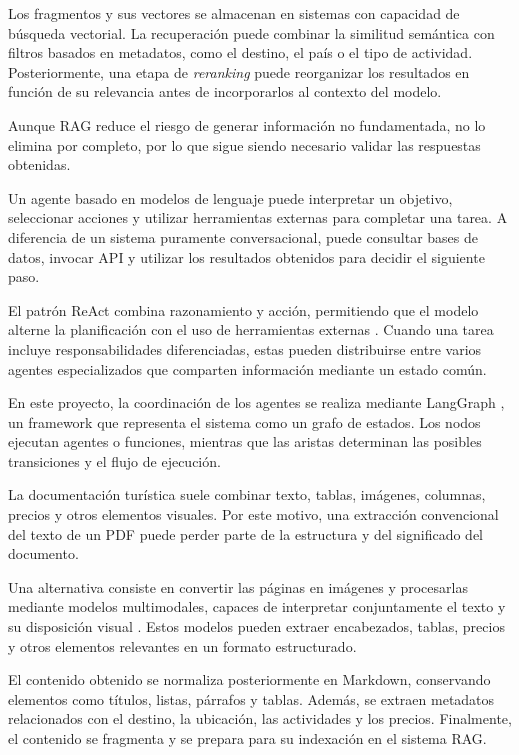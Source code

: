 Los fragmentos y sus vectores se almacenan en sistemas con capacidad de búsqueda vectorial. La recuperación puede combinar la similitud semántica con filtros basados en metadatos, como el destino, el país o el tipo de actividad. Posteriormente, una etapa de \textit{reranking} puede reorganizar los resultados en función de su relevancia antes de incorporarlos al contexto del modelo.

Aunque RAG reduce el riesgo de generar información no fundamentada, no lo elimina por completo, por lo que sigue siendo necesario validar las respuestas obtenidas.

Un agente basado en modelos de lenguaje puede interpretar un objetivo, seleccionar acciones y utilizar herramientas externas para completar una tarea. A diferencia de un sistema puramente conversacional, puede consultar bases de datos, invocar API y utilizar los resultados obtenidos para decidir el siguiente paso.

El patrón ReAct combina razonamiento y acción, permitiendo que el modelo alterne la planificación con el uso de herramientas externas \parencite{yao2023react}. Cuando una tarea incluye responsabilidades diferenciadas, estas pueden distribuirse entre varios agentes especializados que comparten información mediante un estado común.

En este proyecto, la coordinación de los agentes se realiza mediante LangGraph \parencite{langchain2026langgraph}, un framework que representa el sistema como un grafo de estados. Los nodos ejecutan agentes o funciones, mientras que las aristas determinan las posibles transiciones y el flujo de ejecución.

La documentación turística suele combinar texto, tablas, imágenes, columnas, precios y otros elementos visuales. Por este motivo, una extracción convencional del texto de un PDF puede perder parte de la estructura y del significado del documento.

Una alternativa consiste en convertir las páginas en imágenes y procesarlas mediante modelos multimodales, capaces de interpretar conjuntamente el texto y su disposición visual \parencite{openai2023gpt4}. Estos modelos pueden extraer encabezados, tablas, precios y otros elementos relevantes en un formato estructurado.

El contenido obtenido se normaliza posteriormente en Markdown, conservando elementos como títulos, listas, párrafos y tablas. Además, se extraen metadatos relacionados con el destino, la ubicación, las actividades y los precios. Finalmente, el contenido se fragmenta y se prepara para su indexación en el sistema RAG.

